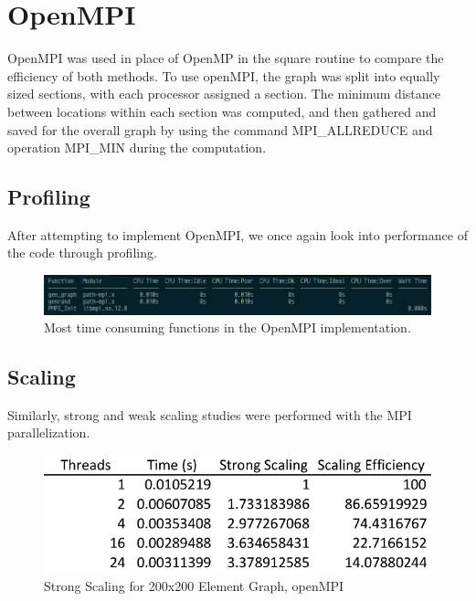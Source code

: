 \documentclass{article}
\begin{document}
\clearpage
\section{OpenMPI}

OpenMPI was used in place of OpenMP in the square routine to compare the efficiency of both methods. To use openMPI, the graph was split into equally sized sections, with each processor assigned a section. The minimum distance between locations within each section was computed, and then gathered and saved for the overall graph by using the command MPI\_ALLREDUCE and operation MPI\_MIN during the computation.  

\subsection{Profiling}
After attempting to implement OpenMPI, we once again look into performance of the code through profiling. 
	\begin{figure}[h!]
		\begin{center}
			\includegraphics[width=0.7\columnwidth]{amplxe_mpi}
			\caption{Most time consuming functions in the OpenMPI implementation.}
			\label{amplxe_mpi}
		\end{center}
	\end{figure}

\subsection{Scaling}
Similarly, strong and weak scaling studies were performed with the MPI parallelization.

	\begin{figure}[h!]
		\begin{center}
			\includegraphics[width=0.5\columnwidth]{st_table_mpi}
			\caption{Strong Scaling for 200x200 Element Graph, openMPI}
			\label{st_mpi_t}
		\end{center}
	\end{figure}
	
\end{document}
